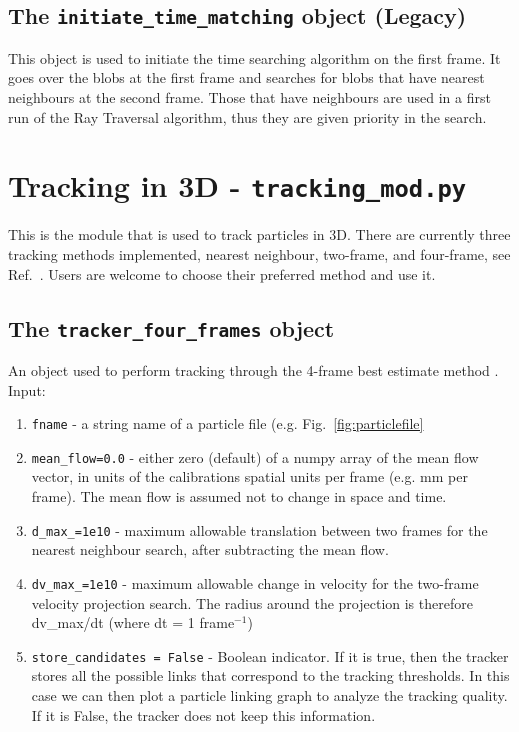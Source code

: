 \documentclass[10pt,a4paper]{article}
\begin{document}
\subsection{The \texttt{initiate\_time\_matching} object  (Legacy)}

This object is used to initiate the time searching algorithm on the first frame. It goes over the blobs at the first frame and searches for blobs that have nearest neighbours at the second frame. Those that have neighbours are used in a first run of the Ray Traversal algorithm, thus they are given priority in the search.













\section{Tracking in 3D - \texttt{tracking\_mod.py}}

This is the module that is used to track particles in 3D. There are currently three tracking methods implemented, nearest neighbour, two-frame, and four-frame, see Ref.~\cite{Ouellette2006}. Users are welcome to choose their preferred method and use it.



\subsection{The \texttt{tracker\_four\_frames} object}\label{sec:four_frames}

An object used to perform tracking through the 4-frame best estimate method \cite{Ouellette2006}. Input:
%
\begin{enumerate}
	\item \texttt{fname} - a string name of a particle file (e.g. Fig.~\ref{fig:particlefile}
	\item \texttt{mean\_flow=0.0} - either zero (default) of a numpy array of the mean flow vector, in units of the calibrations spatial units per frame (e.g. mm per frame). The mean flow is assumed not to change in space and time.
	\item \texttt{d\_max\_=1e10} - maximum allowable translation between two frames for the nearest neighbour search, after subtracting the mean flow. 
	\item \texttt{dv\_max\_=1e10} - maximum allowable change in velocity for the two-frame velocity projection search. The radius around the projection is therefore dv\_max/dt (where dt = 1 frame$^{-1}$)
	\item \texttt{store\_candidates = False} - Boolean indicator. If it is true, then the tracker stores all the possible links that correspond to the tracking thresholds. In this case we can then plot a particle linking graph to analyze the tracking quality. If it is False, the tracker does not keep this information.  
\end{enumerate}
\end{document}
